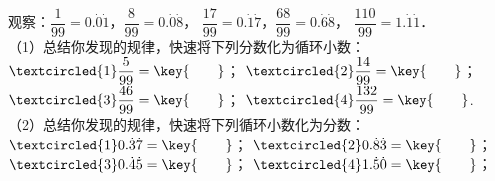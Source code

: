 观察：$\dfrac{1}{99}=0.\dot{0}\dot{1}$，$\dfrac{8}{99}=0.\dot{0}\dot{8}$，
$\dfrac{17}{99}=0.\dot{1}\dot{7}$，$\dfrac{68}{99}=0.\dot{6}\dot{8}$，
$\dfrac{110}{99}=1.\dot{1}\dot{1}$．\\
（1）总结你发现的规律，快速将下列分数化为循环小数：\\
$\textcircled{1}\dfrac{5}{99}=\key{\qquad}$；
$\textcircled{2}\dfrac{14}{99}=\key{\qquad}$；
$\textcircled{3}\dfrac{46}{99}=\key{\qquad}$；
$\textcircled{4}\dfrac{132}{99}=\key{\qquad}$.\\
（2）总结你发现的规律，快速将下列循环小数化为分数：\\
$\textcircled{1}0.\dot{3}\dot{7}=\key{\qquad}$；
$\textcircled{2}0.\dot{8}\dot{3}=\key{\qquad}$；
$\textcircled{3}0.\dot{4}\dot{5}=\key{\qquad}$；
$\textcircled{4}1.\dot{5}\dot{0}=\key{\qquad}$；